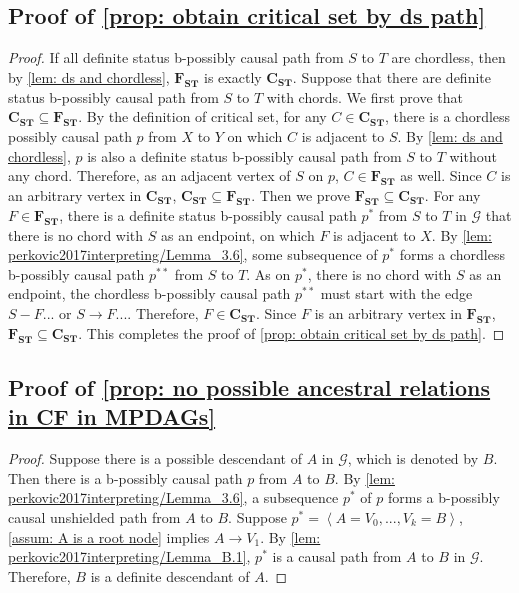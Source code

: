 \documentclass{article}
\begin{document}
\subsection{Proof of \cref{prop: obtain critical set by ds path}}
\label{proof_prop: obtain critical set by ds path}
\begin{proof}
    If all definite status b-possibly causal path from $S$ to $T$ are chordless, then by \cref{lem: ds and chordless}, $\mathbf{F_{ST}}$ is exactly $\mathbf{C_{ST}}$. Suppose that there are definite status b-possibly causal path from $S$ to $T$ with chords. We first prove that $\mathbf{C_{ST}} \subseteq \mathbf{F_{ST}}$. By the definition of critical set, for any $C \in \mathbf{C_{ST}}$, there is a chordless possibly causal path $p$ from $X$ to $Y$ on which $C$ is adjacent to $S$. By \cref{lem: ds and chordless}, $p$ is also a definite status b-possibly causal path from $S$ to $T$ without any chord. Therefore, as an adjacent vertex of $S$ on $p$, $C \in \mathbf{F_{ST}}$ as well. Since $C$ is an arbitrary vertex in $\mathbf{C_{ST}}$, $\mathbf{C_{ST}} \subseteq \mathbf{F_{ST}}$. Then we prove $\mathbf{F_{ST}} \subseteq \mathbf{C_{ST}}$. For any $F \in \mathbf{F_{ST}}$, there is a definite status b-possibly causal path $p^{*}$ from $S$ to $T$ in $\mathcal{G}$ that there is no chord with $S$ as an endpoint, on which $F$ is adjacent to $X$. By \cref{lem: perkovic2017interpreting/Lemma_3.6}, some subsequence of $p^{*}$ forms a chordless b-possibly causal path $p^{\ast \ast}$ from $S$ to $T$. As on $p^{*}$, there is no chord with $S$ as an endpoint, the chordless b-possibly causal path $p^{\ast \ast}$ must start with the edge $S - F ...$ or $S \rightarrow F ...$. Therefore, $F \in \mathbf{C_{ST}}$. Since $F$ is an arbitrary vertex in $\mathbf{F_{ST}}$, $\mathbf{F_{ST}} \subseteq \mathbf{C_{ST}}$. This completes the proof of \cref{prop: obtain critical set by ds path}.
\end{proof}

\subsection{Proof of \cref{prop: no possible ancestral relations in CF in MPDAGs}}
\label{proof_prop: no possible ancestral relations in CF in MPDAGs}
\begin{proof}
    Suppose there is a possible descendant of $A$ in $\mathcal{G}$, which is denoted by $B$. Then there is a b-possibly causal path $p$ from $A$ to $B$. By \cref{lem: perkovic2017interpreting/Lemma_3.6}, a subsequence $p^{*}$ of $p$ forms a b-possibly causal unshielded path from $A$ to $B$. Suppose $p^{*} = \left \langle A=V_0,...,V_k = B \right \rangle$, \cref{assum: A is a root node} implies $A \rightarrow V_1$. By \cref{lem: perkovic2017interpreting/Lemma_B.1}, $p^{*}$ is a causal path from $A$ to $B$ in $\mathcal{G}$. Therefore, $B$ is a definite descendant of $A$.
\end{proof}
\end{document}

